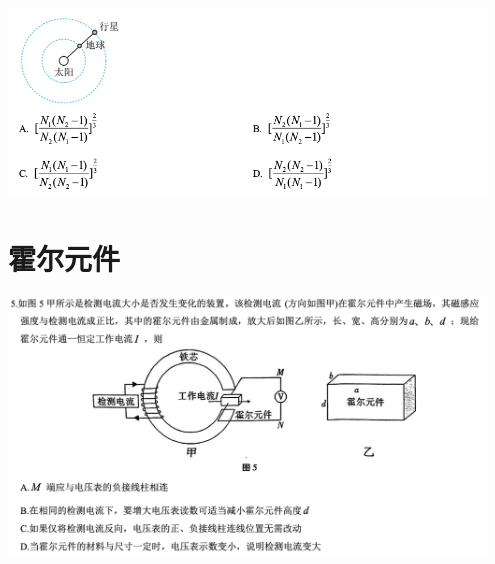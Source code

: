 \documentclass{article}
\begin{document}
\includegraphics[width = 0.95\textwidth]{./pictures/7-2.png}

\vspace{5em}

\section{霍尔元件}
\includegraphics[width = 0.95\textwidth]{./pictures/8.png}

\vspace{5em}
\end{document}
